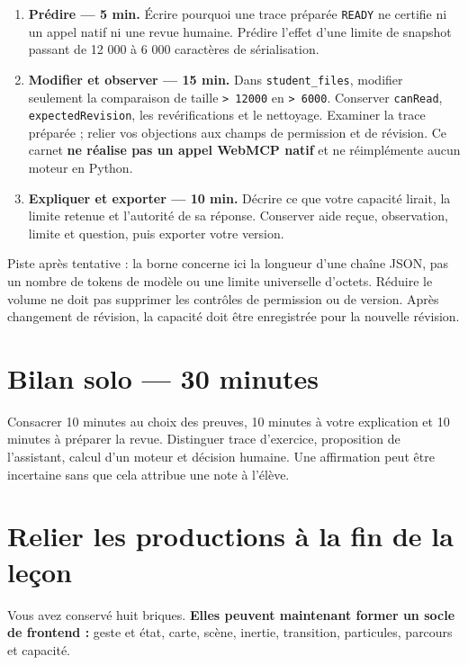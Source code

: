 \documentclass[
  canadien,
  11pt,
  a4paper,
]{report}
\providecommand{\tightlist}{%
  \setlength{\itemsep}{0pt}\setlength{\parskip}{0pt}}
\begin{document}
\begin{enumerate}
\def\labelenumi{\arabic{enumi}.}
\tightlist
\item
  \textbf{Prédire --- 5 min.} Écrire pourquoi une trace préparée
  \texttt{READY} ne certifie ni un appel natif ni une revue humaine.
  Prédire l'effet d'une limite de snapshot passant de 12 000 à 6 000
  caractères de sérialisation.
\item
  \textbf{Modifier et observer --- 15 min.} Dans
  \texttt{student\_\allowbreak{}files}, modifier seulement la comparaison de taille
  \texttt{\textgreater{}\ 12000} en \texttt{\textgreater{}\ 6000}.
  Conserver \texttt{can\allowbreak{}Read}, \texttt{expected\allowbreak{}Revision}, les
  revérifications et le nettoyage. Examiner la trace préparée ; relier
  vos objections aux champs de permission et de révision. Ce carnet
  \textbf{ne réalise pas un appel WebMCP natif} et ne réimplémente aucun
  moteur en Python.
\item
  \textbf{Expliquer et exporter --- 10 min.} Décrire ce que votre
  capacité lirait, la limite retenue et l'autorité de sa réponse.
  Conserver aide reçue, observation, limite et question, puis exporter
  votre version.
\end{enumerate}

Piste après tentative : la borne concerne ici la longueur d'une chaîne
JSON, pas un nombre de tokens de modèle ou une limite universelle
d'octets. Réduire le volume ne doit pas supprimer les contrôles de
permission ou de version. Après changement de révision, la capacité doit
être enregistrée pour la nouvelle révision.

\section{Bilan solo --- 30 minutes}\label{bilan-solo-30-minutes-7}

Consacrer 10 minutes au choix des preuves, 10 minutes à votre
explication et 10 minutes à préparer la revue. Distinguer trace
d'exercice, proposition de l'assistant, calcul d'un moteur et décision
humaine. Une affirmation peut être incertaine sans que cela attribue une
note à l'élève.

\section{Relier les productions à la fin de la
leçon}\label{relier-les-productions-uxe0-la-fin-de-la-leuxe7on}

Vous avez conservé huit briques. \textbf{Elles peuvent maintenant former
un socle de frontend :} geste et état, carte, scène, inertie,
transition, particules, parcours et capacité.
\end{document}

